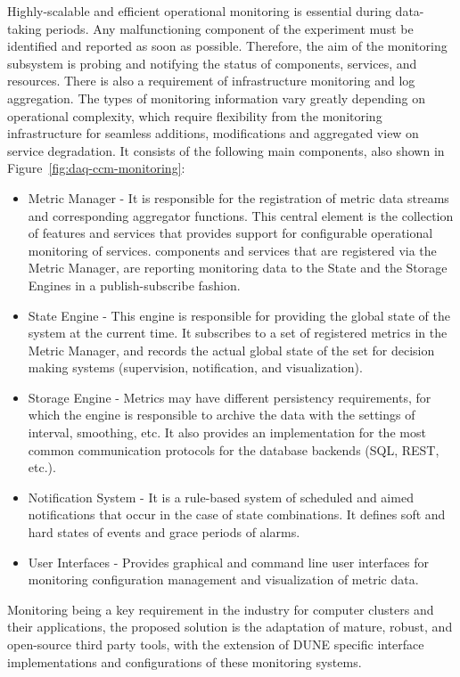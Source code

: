 Highly-scalable and efficient operational monitoring is essential during data-taking periods. Any malfunctioning component of the experiment must be identified and reported as soon as possible. Therefore, the aim of the monitoring subsystem is probing and notifying the status of  components, services, and resources. There is also a requirement of  infrastructure monitoring and log aggregation. The types of monitoring information vary greatly depending on operational complexity, which require flexibility from the monitoring infrastructure for seamless additions, modifications and aggregated view on service degradation.
It consists of the following main components, also shown in Figure~\ref{fig:daq-ccm-monitoring}:


\begin{itemize}
  \item Metric Manager - It is responsible for the registration of metric data streams and corresponding aggregator functions. This central element is the collection of features and services that provides support for configurable operational monitoring of  services.  components and services that are registered via the Metric Manager, are reporting monitoring data to the State and the Storage Engines in a publish-subscribe fashion. 
  \item State Engine - This engine is responsible for providing the global state of the system at the current time. It subscribes to a set of registered metrics in the Metric Manager, and records the actual global state of the set for decision making systems (supervision, notification, and visualization).
  \item Storage Engine - Metrics may have different persistency requirements, for which the engine is responsible to archive the data with the settings of interval, smoothing, etc. It also provides an implementation for the most common communication protocols for the database backends (SQL, REST, etc.).
  \item Notification System - It is a rule-based system of scheduled and aimed notifications that occur in the case of state combinations. It defines soft and hard states of events and grace periods of alarms.
  \item User Interfaces - Provides graphical and command line user interfaces for monitoring configuration management and visualization of metric data.
\end{itemize}

Monitoring being a key requirement in the industry for computer clusters and their applications, the proposed solution is the adaptation of mature, robust, and open-source third party tools, with the extension of DUNE  specific interface implementations and configurations of these monitoring systems. 


